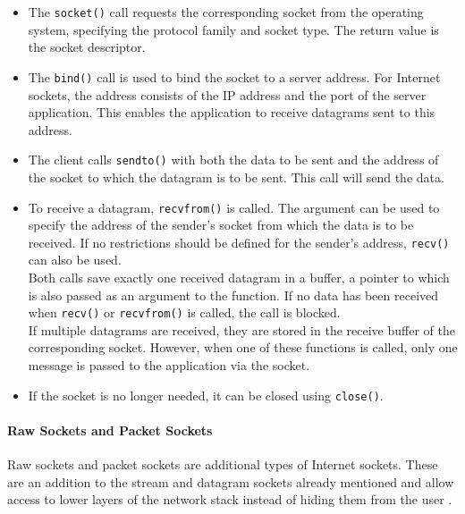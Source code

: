\begin{itemize}
\item The \texttt{socket()} call requests the corresponding socket from the operating system, specifying the protocol family and socket type. The return value is the socket descriptor.
\item The \texttt{bind()} call is used to bind the socket to a server address. For Internet sockets, the address consists of the IP address and the port of the server application. This enables the application to receive datagrams sent to this address.
\item The client calls \texttt{sendto()} with both the data to be sent and the address of the socket to which the datagram is to be sent. This call will send the data.
\item \begin{minipage}[t]{\linewidth}
            To receive a datagram, \texttt{recvfrom()} is called. The argument can be used to specify the address of the sender's socket from which the data is to be received. If no restrictions should be defined for the sender's address, \texttt{recv()} can also be used.\\
            Both calls save exactly one received datagram in a buffer, a pointer to which is also passed as an argument to the function. If no data has been received when \texttt{recv()} or \texttt{recvfrom()} is called, the call is blocked.\\
            If multiple datagrams are received, they are stored in the receive buffer of the corresponding socket. However, when one of these functions is called, only one message is passed to the application via the socket.
      \end{minipage}
\item If the socket is no longer needed, it can be closed using \texttt{close()}.
\end{itemize}


\paragraph{Raw Sockets and Packet Sockets}

Raw sockets and packet sockets are additional types of Internet sockets. These are an addition to the stream and datagram sockets already mentioned and allow access to lower layers of the network stack instead of hiding them from the user \cite{sock07}.

